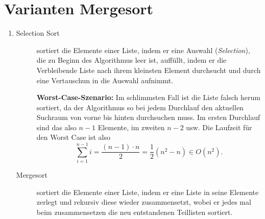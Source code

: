 \documentclass[a4paper,10pt]{scrartcl}
\begin{document}
\section{Varianten Mergesort}
\begin{enumerate}
\item \begin{description}
       \item[Selection Sort] sortiert die Elemente einer Liste, indem er eine
Auswahl (\textit{Selection}), die zu Beginn des Algorithmus leer ist, auff\"ullt,
indem er die Verbleibende Liste nach ihrem kleinsten Element durchsucht und
durch eine Vertauschun in die Auswahl aufnimmt.

\textbf{Worst-Case-Szenario:} Im schlimmsten Fall ist die Liste falsch
herum sortiert, da der Algorithmus so bei jedem Durchlauf den aktuellen
Suchraum von vorne bis hinten durchsuchen muss. Im ersten Durchlauf sind das
also $n-1$ Elemente, im zweiten $n-2$ usw. Die Laufzeit f\"ur den Worst Case ist
also
\[
 \sum\limits_{i = 1}^{n-1} i = \frac{(n-1) \cdot n}{2} = \frac{1}{2} \left(n^2 - n\right) \in O(n^2).
\]


       \item[Mergesort] sortiert die Elemente einer Liste, indem er eine Liste
in seine Elemente zerlegt und rekursiv diese wieder zusammensetzt, wobei er
jedes mal beim zusammensetzen die neu entstandenen Teillisten sortiert.


\end{description}
\end{enumerate}
\end{document}
